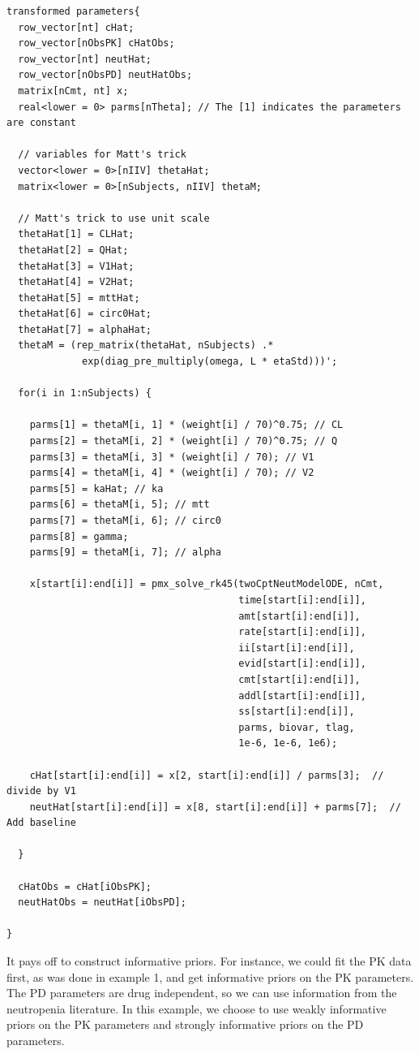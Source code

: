 \documentclass[10pt, reqno, oneside]{amsbook}
\numberwithin{equation}{chapter}
\numberwithin{figure}{chapter}
\numberwithin{table}{chapter}
\theoremstyle{remark}
\begin{document}
\begin{verbatim}
transformed parameters{
  row_vector[nt] cHat;
  row_vector[nObsPK] cHatObs;
  row_vector[nt] neutHat;
  row_vector[nObsPD] neutHatObs;
  matrix[nCmt, nt] x;
  real<lower = 0> parms[nTheta]; // The [1] indicates the parameters are constant

  // variables for Matt's trick
  vector<lower = 0>[nIIV] thetaHat;
  matrix<lower = 0>[nSubjects, nIIV] thetaM; 

  // Matt's trick to use unit scale
  thetaHat[1] = CLHat; 
  thetaHat[2] = QHat;
  thetaHat[3] = V1Hat;
  thetaHat[4] = V2Hat;
  thetaHat[5] = mttHat;
  thetaHat[6] = circ0Hat;
  thetaHat[7] = alphaHat;
  thetaM = (rep_matrix(thetaHat, nSubjects) .* 
             exp(diag_pre_multiply(omega, L * etaStd)))';

  for(i in 1:nSubjects) {

    parms[1] = thetaM[i, 1] * (weight[i] / 70)^0.75; // CL
    parms[2] = thetaM[i, 2] * (weight[i] / 70)^0.75; // Q
    parms[3] = thetaM[i, 3] * (weight[i] / 70); // V1
    parms[4] = thetaM[i, 4] * (weight[i] / 70); // V2
    parms[5] = kaHat; // ka
    parms[6] = thetaM[i, 5]; // mtt
    parms[7] = thetaM[i, 6]; // circ0
    parms[8] = gamma;
    parms[9] = thetaM[i, 7]; // alpha

    x[start[i]:end[i]] = pmx_solve_rk45(twoCptNeutModelODE, nCmt,
                                        time[start[i]:end[i]], 
                                        amt[start[i]:end[i]], 
                                        rate[start[i]:end[i]], 
                                        ii[start[i]:end[i]], 
                                        evid[start[i]:end[i]], 
                                        cmt[start[i]:end[i]], 
                                        addl[start[i]:end[i]], 
                                        ss[start[i]:end[i]],
                                        parms, biovar, tlag,
                                        1e-6, 1e-6, 1e6);

    cHat[start[i]:end[i]] = x[2, start[i]:end[i]] / parms[3];  // divide by V1
    neutHat[start[i]:end[i]] = x[8, start[i]:end[i]] + parms[7];  // Add baseline

  }

  cHatObs = cHat[iObsPK];
  neutHatObs = neutHat[iObsPD];

}
\end{verbatim}

It pays off to construct informative priors. For instance, we could
fit the PK data first, as was done in  example 1, and get informative
priors on the PK parameters. The PD parameters are drug independent,
so we can use information from the neutropenia literature. In this
example, we choose to use weakly informative priors on the PK
parameters and strongly informative priors on the PD parameters. 
\end{document}
